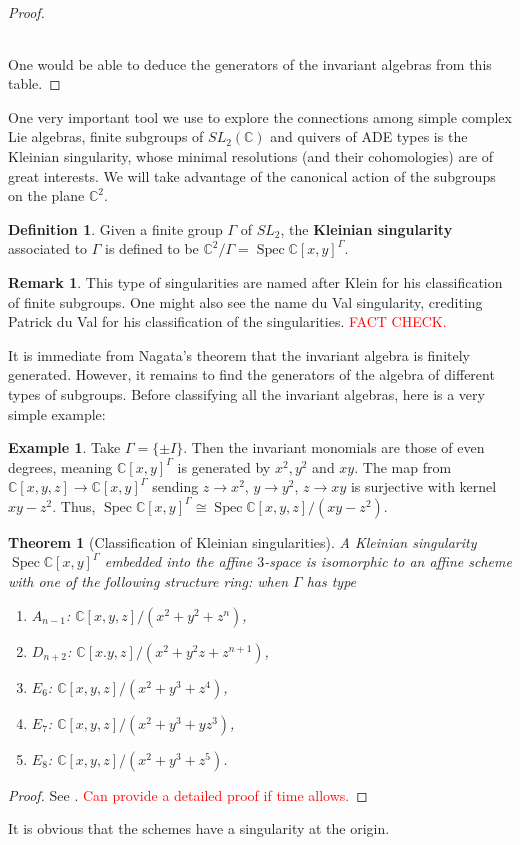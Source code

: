 \documentclass[12pt]{report}
\newtheorem{theorem}{Theorem}[section]
\theoremstyle{remark}
\theoremstyle{definition}
\newtheorem{remark}{Remark}[section]
\newtheorem{example}{Example}[section]
\newtheorem{definition}{Definition}[section]
\newcommand{\C}[0]{\mathbb{C}}
\newcommand{\Spec}[0]{\operatorname{Spec}}
\begin{document}
\begin{proof}
\begin{table}[!h]
\begin{tabular}{|c|l|c|}
            \end{tabular}%
        \end{table}
        One would be able to deduce the generators of the invariant algebras from this table.
    \end{proof}

    One very important tool we use to explore the connections among simple complex Lie algebras, finite subgroups of $SL_2(\C)$ and quivers of ADE types is the Kleinian singularity, whose minimal resolutions (and their cohomologies) are of great interests. We will take advantage of the canonical action of the subgroups on the plane $\C^2$.
    \begin{definition}
        Given a finite group $\Gamma$ of $SL_2$, the \textbf{Kleinian singularity} associated to $\Gamma$ is defined to be $\C^2/\Gamma=\Spec \C[x, y]^\Gamma$.
    \end{definition}
    \begin{remark}
        This type of singularities are named after Klein for his classification of finite subgroups. One might also see the name du Val singularity, crediting Patrick du Val for his classification of the singularities. \textcolor{red}{FACT CHECK.}
    \end{remark}
    It is immediate from Nagata's theorem that the invariant algebra is finitely generated. However, it remains to find the generators of the algebra of different types of subgroups. Before classifying all the invariant algebras, here is a very simple example:
    \begin{example}
        Take $\Gamma=\{\pm I\}$. Then the invariant monomials are those of even degrees, meaning $\C[x, y]^\Gamma$ is generated by $x^2, y^2$ and $xy$. The map from $\C[x, y, z]\to \C[x, y]^\Gamma$ sending $z\to x^2$, $y\to y^2$, $z\to xy$ is surjective with kernel $xy-z^2$. Thus, $\Spec \C[x, y]^\Gamma\cong \Spec \C[x, y, z]/(xy-z^2)$.
    \end{example}
    \begin{theorem}[Classification of Kleinian singularities]
        A Kleinian singularity $\Spec \C[x, y]^\Gamma$ embedded into the affine $3$-space is isomorphic to an affine scheme with one of the following structure ring: when $\Gamma$ has type
        \begin{enumerate}[\normalfont(i)]
            \item $A_{n-1}$: $\C[x, y, z]/(x^2+y^2+z^n)$,
            \item $D_{n+2}$: $\C[x. y, z]/(x^2+y^2z+z^{n+1})$,
            \item $E_6$: $\C[x,y,z]/(x^2+y^3+z^4)$,
            \item $E_7$: $\C[x,y,z]/(x^2+y^3+yz^3)$,
            \item $E_8$: $\C[x,y,z]/(x^2+y^3+z^5)$.
        \end{enumerate}
    \end{theorem}
    \begin{proof}
        See \cite{dolgachev_2009_mckay}. \textcolor{red}{Can provide a detailed proof if time allows.}
    \end{proof}
    It is obvious that the schemes have a singularity at the origin. 
\end{document}
